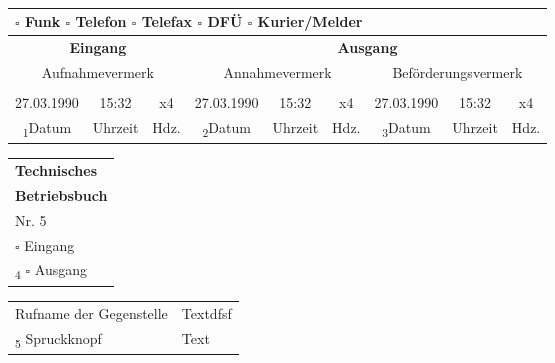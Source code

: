 \documentclass[a5paper,6pt]{article}
\def \ehs{17pt}
\def \duhhs{\hspace{0pt}}
\def \datum{27.03.1990}
\def \uhrzeit{15:32}
\def \hdz{x4}
\def \nr{5}
\def \uncheckedbox{$\square$ }
\def \duh{Datum\duhhs&\duhhs Uhrzeit\duhhs&\duhhs Hdz.\duhhs}
\begin{document}
\small 
\textbf{}\\
\begin{minipage}{\textwidth}
\begin{tabular}{|c|c|c|c|c|c|c|c|c|}
	\hline
	\multicolumn{9}{|l|}{\quad \uncheckedbox Funk \hspace{\ehs} \uncheckedbox Telefon \hspace{\ehs} \uncheckedbox Telefax \hspace{\ehs}  \uncheckedbox DFÜ \hspace{\ehs}  \uncheckedbox Kurier/Melder}   \\
	\hline
	\multicolumn{3}{|c|}{\textbf{Eingang}} & \multicolumn{6}{c|}{\textbf{Ausgang}}\\
	\hline
	\multicolumn{3}{|c|}{Aufnahmevermerk} & \multicolumn{3}{c|}{Annahmevermerk} & 	\multicolumn{3}{c|}{Beförderungsvermerk}\\
	\multicolumn{3}{|c|}{} & \multicolumn{3}{c|}{} & \multicolumn{3}{c|}{}\\
	\datum & \uhrzeit  & \hdz & \datum & \uhrzeit  & \hdz &	\datum & \uhrzeit  & \hdz \\
	\hline
	\textsubscript{1}\duh  & \textsubscript{2}\duh &\textsubscript{3}\duh \\
	\hline
\end{tabular}
\hspace{-9.5pt}
\renewcommand{\arraystretch}{1.228}
\begin{tabular}{l|}
	\hline
	\textbf{Technisches}\\
	\textbf{Betriebsbuch}\\
	\quad Nr. \nr \\
	\hspace{11.3pt} \uncheckedbox Eingang\\
	\textsubscript{4} \hspace{4pt} \uncheckedbox Ausgang 	\vspace{0pt}\\
	\hline
\end{tabular}
\vspace{-1pt}
\end{minipage}
\begin{minipage}{\textwidth}
\begin{tabularx}{0.9913\textwidth}{|l|X|}
\hspace{4pt} Rufname der Gegenstelle \hspace{20pt} & Textdfsf \\
\textsubscript{5} Spruckknopf & Text\\
\hline
\end{tabularx}
\vspace{-1.5pt}
\end{minipage}
\end{document}
